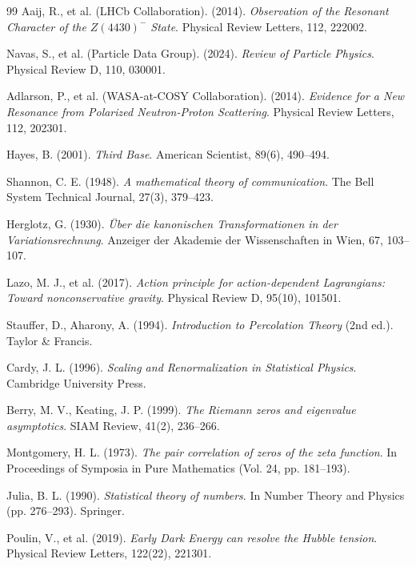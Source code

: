 \documentclass[11pt, a4paper]{article}
\theoremstyle{plain}
\theoremstyle{definition}
\begin{document}
\begin{thebibliography}{99}
Aaij, R., et al. (LHCb Collaboration). (2014). \textit{Observation of the Resonant Character of the $Z(4430)^-$ State}. Physical Review Letters, 112, 222002.

Navas, S., et al. (Particle Data Group). (2024). \textit{Review of Particle Physics}. Physical Review D, 110, 030001.

Adlarson, P., et al. (WASA-at-COSY Collaboration). (2014). \textit{Evidence for a New Resonance from Polarized Neutron-Proton Scattering}. Physical Review Letters, 112, 202301.

Hayes, B. (2001). \textit{Third Base}. American Scientist, 89(6), 490–494.

Shannon, C. E. (1948). \textit{A mathematical theory of communication}. The Bell System Technical Journal, 27(3), 379–423.

Herglotz, G. (1930). \textit{Über die kanonischen Transformationen in der Variationsrechnung}. Anzeiger der Akademie der Wissenschaften in Wien, 67, 103–107.

Lazo, M. J., et al. (2017). \textit{Action principle for action-dependent Lagrangians: Toward nonconservative gravity}. Physical Review D, 95(10), 101501.

Stauffer, D., Aharony, A. (1994). \textit{Introduction to Percolation Theory} (2nd ed.). Taylor \& Francis.

Cardy, J. L. (1996). \textit{Scaling and Renormalization in Statistical Physics}. Cambridge University Press.

Berry, M. V., Keating, J. P. (1999). \textit{The Riemann zeros and eigenvalue asymptotics}. SIAM Review, 41(2), 236–266.

Montgomery, H. L. (1973). \textit{The pair correlation of zeros of the zeta function}. In Proceedings of Symposia in Pure Mathematics (Vol. 24, pp. 181–193).

Julia, B. L. (1990). \textit{Statistical theory of numbers}. In Number Theory and Physics (pp. 276–293). Springer.

Poulin, V., et al. (2019). \textit{Early Dark Energy can resolve the Hubble tension}. Physical Review Letters, 122(22), 221301.


\end{thebibliography}
\end{document}
